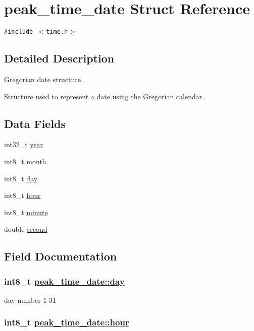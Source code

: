 \hypertarget{structpeak__time__date}{
\section{peak\_\-time\_\-date Struct Reference}
\label{structpeak__time__date}
}
{\tt \#include $<$time.h$>$}



\subsection{Detailed Description}
Gregorian date structure. 

Structure used to represent a date using the Gregorian calendar. 

\subsection*{Data Fields}
\begin{CompactItemize}
\item 
int32\_\-t \hyperlink{structpeak__time__date_o0}{year}
\item 
int8\_\-t \hyperlink{structpeak__time__date_o1}{month}
\item 
int8\_\-t \hyperlink{structpeak__time__date_o2}{day}
\item 
int8\_\-t \hyperlink{structpeak__time__date_o3}{hour}
\item 
int8\_\-t \hyperlink{structpeak__time__date_o4}{minute}
\item 
double \hyperlink{structpeak__time__date_o5}{second}
\end{CompactItemize}


\subsection{Field Documentation}
\hypertarget{structpeak__time__date_o2}{
\subsubsection[day]{\setlength{\rightskip}{0pt plus 5cm}int8\_\-t \hyperlink{structpeak__time__date_o2}{peak\_\-time\_\-date::day}}}
\label{structpeak__time__date_o2}


day number 1-31 \hypertarget{structpeak__time__date_o3}{
\subsubsection[hour]{\setlength{\rightskip}{0pt plus 5cm}int8\_\-t \hyperlink{structpeak__time__date_o3}{peak\_\-time\_\-date::hour}}}
\label{structpeak__time__date_o3}


